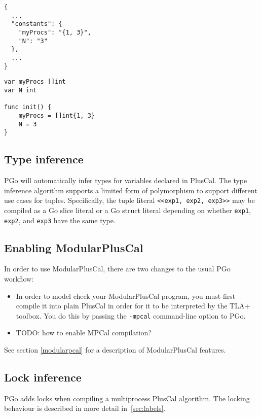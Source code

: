 \noindent\begin{minipage}{0.45\textwidth}
\begin{lstlisting}
{
  ...
  "constants": {
    "myProcs": "{1, 3}",
    "N": "3"
  },
  ...
}
\end{lstlisting}
\end{minipage}
\hfill\begin{minipage}{0.45\textwidth}
\begin{lstlisting}[language=golang]
var myProcs []int
var N int

func init() {
	myProcs = []int{1, 3}
	N = 3
}
\end{lstlisting}
\end{minipage}

\subsection{Type inference}
PGo will automatically infer types for variables declared in PlusCal. The type inference algorithm supports a limited form of polymorphism to support different use cases for tuples. Specifically, the tuple literal \lstinline[language=pcal]|<<exp1, exp2, exp3>>| may be compiled as a Go slice literal or a Go struct literal depending on whether \lstinline[language=pcal]|exp1|, \lstinline[language=pcal]|exp2|, and \lstinline[language=pcal]|exp3| have the same type.

\subsection{Enabling ModularPlusCal}

In order to use ModularPlusCal, there are two changes to the usual PGo workflow:
\begin{itemize}
    \item In order to model check your ModularPlusCal program, you must first compile it into plain PlusCal in order for it to be interpreted by the TLA+ toolbox. You do this by passing the \lstinline|-mpcal| command-line option to PGo.
    \item TODO: how to enable MPCal compilation?
\end{itemize}

See section \ref{modularpcal} for a description of ModularPlusCal features.

\subsection{Lock inference}
PGo adds locks when compiling a multiprocess PlusCal algorithm. The locking behaviour is described in more detail in~\ref{sec:labels}.
